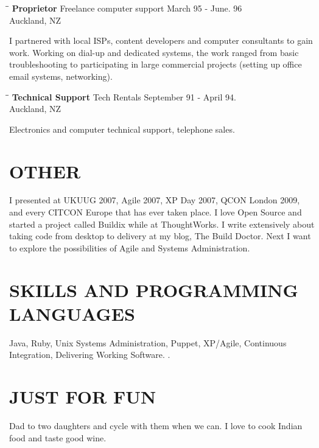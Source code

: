 \documentclass{res}
\begin{document}
\begin{resume}
	\begin{tabbing}
	   \hspace{2.3in}\= \hspace{2.6in}\= \kill %
	    {\bf Proprietor} \>Freelance computer support \> March 95 - June. 96\\
	                          \>Auckland, NZ
	\end{tabbing}\vspace{-20pt}
	I partnered with local ISPs, content developers and computer consultants to gain work. Working on dial-up and dedicated systems, the work ranged from basic troubleshooting to participating in large commercial projects (setting up office email systems, networking).
	
	\begin{tabbing}
	   \hspace{2.3in}\= \hspace{2.6in}\= \kill %
	    {\bf Technical Support} \>Tech Rentals \> September 91 - April 94.\\
	                          \>Auckland, NZ
	\end{tabbing}\vspace{-20pt}
	Electronics and computer technical support, telephone sales.

	   
\section{OTHER}          
    I presented at UKUUG 2007, Agile 2007, XP Day 2007, QCON London 2009, and every CITCON Europe that has ever taken place.  I love Open Source and started a project called Buildix while at ThoughtWorks.  I write extensively about taking code from desktop to delivery at my blog, The Build Doctor.  Next I want to explore the possibilities of Agile and Systems Administration.
 

\section{SKILLS AND PROGRAMMING LANGUAGES}          
    Java, Ruby, Unix Systems Administration, Puppet, XP/Agile, Continuous Integration, Delivering Working Software.
.
     
\section{JUST FOR FUN}          
    Dad to two daughters and cycle with them when we can. I love to cook Indian food and taste good wine.

\end{resume}
\end{document}
